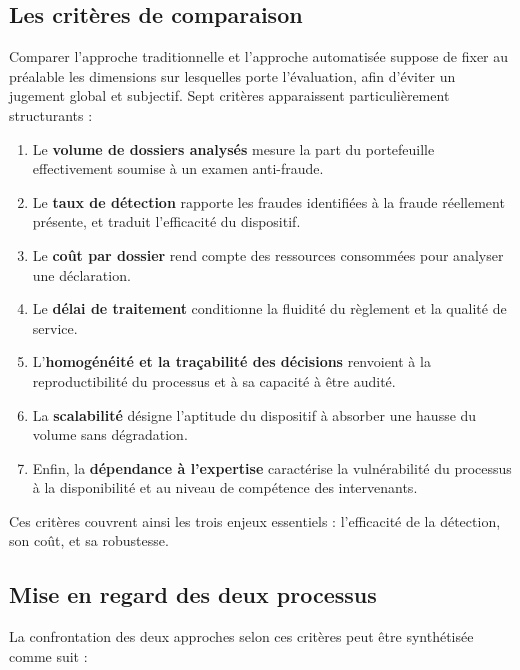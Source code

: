 \subsection{Les critères de comparaison}

Comparer l'approche traditionnelle et l'approche automatisée suppose de fixer au préalable les dimensions sur lesquelles porte l'évaluation, afin d'éviter un jugement global et subjectif. Sept critères apparaissent particulièrement structurants :

\begin{enumerate}
    \item Le \textbf{volume de dossiers analysés} mesure la part du portefeuille effectivement soumise à un examen anti-fraude.
    \item Le \textbf{taux de détection} rapporte les fraudes identifiées à la fraude réellement présente, et traduit l'efficacité du dispositif.
    \item Le \textbf{coût par dossier} rend compte des ressources consommées pour analyser une déclaration.
    \item Le \textbf{délai de traitement} conditionne la fluidité du règlement et la qualité de service.
    \item L'\textbf{homogénéité et la traçabilité des décisions} renvoient à la reproductibilité du processus et à sa capacité à être audité.
    \item La \textbf{scalabilité} désigne l'aptitude du dispositif à absorber une hausse du volume sans dégradation.
    \item Enfin, la \textbf{dépendance à l'expertise} caractérise la vulnérabilité du processus à la disponibilité et au niveau de compétence des intervenants.
\end{enumerate}

Ces critères couvrent ainsi les trois enjeux essentiels : l'efficacité de la détection, son coût, et sa robustesse.

\subsection{Mise en regard des deux processus}

La confrontation des deux approches selon ces critères peut être synthétisée comme suit :

